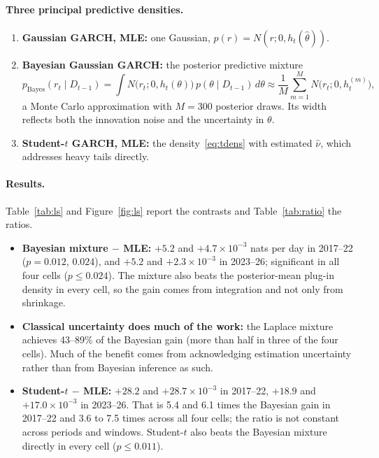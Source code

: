 \documentclass[11pt]{article}
\begin{document}
\paragraph{Three principal predictive densities.}
\begin{enumerate}
\item[A.] \textbf{Gaussian GARCH, MLE:} one Gaussian, $p(r)=N(r;0,h_t(\hat\theta))$.
\item[B.] \textbf{Bayesian Gaussian GARCH:} the posterior predictive mixture
\[
p_{\text{Bayes}}(r_t\mid D_{t-1})=\int N\bigl(r_t;0,h_t(\theta)\bigr)\,p(\theta\mid D_{t-1})\,d\theta
\approx\frac1M\sum_{m=1}^{M}N\bigl(r_t;0,h_t^{(m)}\bigr),
\]
a Monte Carlo approximation with $M=300$ posterior draws. Its width reflects both the innovation noise and the
uncertainty in $\theta$.
\item[C.] \textbf{Student-$t$ GARCH, MLE:} the density~\eqref{eq:tdens} with estimated $\hat\nu$, which addresses heavy
tails directly.
\end{enumerate}

\paragraph{Results.} Table~\ref{tab:ls} and Figure~\ref{fig:ls} report the contrasts and Table~\ref{tab:ratio} the
ratios.
\begin{itemize}
\item \textbf{Bayesian mixture $-$ MLE:} $+5.2$ and $+4.7\times10^{-3}$ nats per day in 2017--22 ($p=0.012$, $0.024$),
and $+5.2$ and $+2.3\times10^{-3}$ in 2023--26; significant in all four cells ($p\le0.024$). The mixture also beats the
posterior-mean plug-in density in every cell, so the gain comes from integration and not only from shrinkage.
\item \textbf{Classical uncertainty does much of the work:} the Laplace mixture achieves 43--89\% of the Bayesian gain
(more than half in three of the four cells). Much of the benefit comes from acknowledging estimation uncertainty
rather than from Bayesian inference as such.
\item \textbf{Student-$t$ $-$ MLE:} $+28.2$ and $+28.7\times10^{-3}$ in 2017--22, $+18.9$ and $+17.0\times10^{-3}$ in
2023--26. That is 5.4 and 6.1 times the Bayesian gain in 2017--22 and 3.6 to 7.5 times across all four cells; the
ratio is not constant across periods and windows. Student-$t$ also beats the Bayesian mixture directly in every cell
($p\le0.011$).
\end{itemize}
\end{document}
